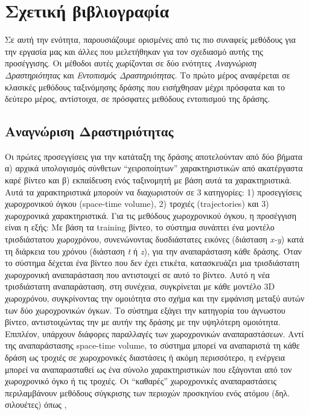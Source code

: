 \documentclass{report}
\newcommand{\tl}{\textlatin}
\newcommand{\en}{\selectlanguage{english}}
\newcommand{\gr}{\selectlanguage{greek}}
\begin{document}
\gr
\section{Σχετική βιβλιογραφία}
Σε αυτή την ενότητα, παρουσιάζουμε ορισμένες από τις πιο συναφείς μεθόδους για την εργασία μας και άλλες που μελετήθηκαν για τον σχεδιασμό αυτής της προσέγγισης.
Οι μέθοδοι αυτές  χωρίζονται σε δύο ενότητες \textit{Aναγνώριση Δραστηριότητας} και \textit{Εντοπισμός Δραστηριότητας}. Το πρώτο μέρος αναφέρεται σε κλασικές μεθόδους
ταξινόμησης δράσης που εισήχθησαν μέχρι πρόσφατα και το δεύτερο μέρος, αντίστοιχα, σε πρόσφατες μεθόδους εντοπισμού της δράσης. 

\subsection{Αναγνώριση Δραστηριότητας}
Οι πρώτες προσεγγίσεις για την κατάταξη της δράσης αποτελούνταν από δύο βήματα α) αρχικά υπολογισμός σύνθετων ``χειροποίητων'' χαρακτηριστικών από ακατέργαστα καρέ βίντεο
και β) εκπαίδευση ενός ταξινομητή με βάση αυτά τα χαρακτηριστικά. Αυτά τα χαρακτηριστικά μπορούν να διαχωριστούν σε 3 κατηγορίες:
1) προσεγγίσεις χωροχρονικού όγκου \tl{(space-time volume)}, 2) τροχιές \tl{(trajectories)} και 3) χωροχρονικά  χαρακτηριστικά. Για τις μεθόδους χωροχρονικού όγκου,
η προσέγγιση είναι η εξής: Με βάση τα \tl{training} βίντεο, το σύστημα συνάπτει ένα μοντέλο τρισδιάστατου χωροχρόνου, συνενώνοντας δυσδιάστατες εικόνες
(διάσταση \tl{\textit{x-y}}) κατά τη διάρκεια του χρόνου (διάσταση \tl{\textit{t}} ή \tl{\textit{z}}), για την αναπαράσταση κάθε δράσης.
Όταν το σύστημα δέχεται ένα βίντεο που δεν έχει ετικέτα, κατασκευάζει μια τρισδιάστατη χωροχρονική αναπαράσταση που αντιστοιχεί σε αυτό το βίντεο.
Αυτό η νέα τρισδιάστατη αναπαράσταση, στη συνέχεια, συγκρίνεται με κάθε μοντέλο \tl{3D} χωροχρόνου, συγκρίνοντας την ομοιότητα στο σχήμα
και την εμφάνιση μεταξύ αυτών των δύο χωροχρονικών όγκων.
Το σύστημα εξάγει την κατηγορία του άγνωστου βίντεο, αντιστοιχώντας την με αυτήν της δράσης με την υψηλότερη ομοιότητα. Επιπλέον, υπάρχουν
διάφορες παραλλαγές των  χωροχρονικών αναπαραστάσεων. Αντί της αναπαράστασης \tl{space-time volume}, το σύστημα μπορεί να αναπαριστά τη κάθε δράση ως τροχιές
σε χωροχρονικές διαστάσεις ή ακόμη περισσότερο, η ενέργεια μπορεί να αναπαρασταθεί ως ένα σύνολο χαρακτηριστικών που εξάγονται από τον χωροχρονικό όγκο ή τις τροχιές.
Οι ``καθαρές'' χωροχρονικές αναπαραστάσεις περιλαμβάνουν μεθόδους σύγκρισης των περιοχών προσκηνίου ενός ατόμου (δηλ. σιλουέτες) όπως \en \cite{BobickAaron},\gr
\end{document}
